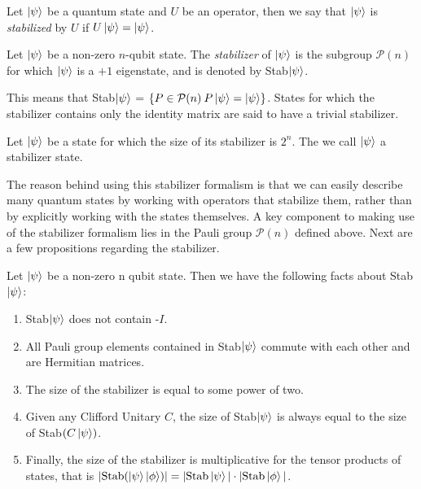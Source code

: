 \documentclass[12pt]{dalthesis}
\begin{document}
\begin{definition}
Let $\ket{\psi}$ be a quantum state and $U$ be an operator, then we say that $\ket{\psi}$ is \emph{stabilized} by $U$ if $U\ket{\psi} = \ket{\psi}$. 
\end{definition}

\begin{definition}[Stabilizer]
Let $\ket{\psi}$ be a non-zero $n$-qubit state. The \emph{stabilizer} of $\ket{\psi}$ is the subgroup $\mathcal{P}(n)$ for which $\ket{\psi}$ is a $+1$ eigenstate, and is denoted by Stab$\ket{\psi}$. 
\end{definition}

This means that Stab$\ket{\psi}$ = $\{P \in \mathcal{P}(n) \: P \ket{\psi} = \ket{\psi} \}$.  States for which the stabilizer contains only the identity matrix are said to have a trivial stabilizer. 

\begin{definition}
Let $\ket{\psi}$ be a state for which the size of its stabilizer is $2^n$. The we call $\ket{\psi}$ a stabilizer state.
\end{definition}

The reason behind using this stabilizer formalism is that we can easily describe many quantum states by working with operators that stabilize them, rather than by explicitly working with the states themselves. A key component to making use of the stabilizer formalism lies in the Pauli group $\mathcal{P}(n)$ defined above. Next are a few propositions regarding the stabilizer.

\begin{proposition}
\label{stabilizerfacts}
Let $\ket{\psi}$ be a non-zero n qubit state. Then we have the following facts about Stab$\ket{\psi}$:
\begin{enumerate}
\item Stab$\ket{\psi}$ does not contain -$I$.
\item All Pauli group elements contained in Stab$\ket{\psi}$ commute with each other and are Hermitian matrices.
\item The size of the stabilizer is equal to some power of two.
\item Given any Clifford Unitary $C$, the size of Stab$\ket{\psi}$ is always equal to the size of Stab$(C \ket{\psi})$.
\item Finally, the size of the stabilizer is multiplicative for the tensor products of states, that is $| \text{Stab} (\ket{\psi} \ket{\phi})| = |\text{Stab}\ket{\psi}| \cdot |\text{Stab}\ket{\phi}|$. 
\end{enumerate}
\end{proposition}
\end{document}
